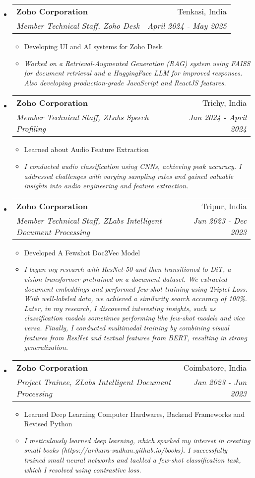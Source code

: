 \documentclass[letterpaper,11pt]{article}
\makeatletter
\newcommand{\resitem}[1]{\item #1 \vspace{-2pt}}
\newcommand{\ressubheading}[4]{
\begin{tabular*}{6.5in}{l@{\extracolsep{\fill}}r}
    \textbf{#1} & #2 \\
    \textit{#3} & \textit{#4} \\
\end{tabular*}\vspace{-4pt}} %
\makeatother
\begin{document}
\begin{itemize}
\begin{itemize}
    \end{itemize}
\newpage
\item[]
    \ressubheading{Zoho Corporation}{Tenkasi, India}{Member Technical Staff, Zoho Desk}{April 2024 - May 2025}
    \begin{itemize}
        \resitem{Developing UI and AI systems for Zoho Desk.}
        \resitem{\textit{Worked on a Retrieval-Augmented Generation (RAG) system using FAISS for document retrieval and a HuggingFace LLM for improved responses. Also developing production-grade JavaScript and ReactJS features.}}
    \end{itemize}
\item[]
	\ressubheading{Zoho Corporation}{Trichy, India}{Member Technical Staff, ZLabs Speech Profiling}{Jan 2024 - April 2024}
	\begin{itemize}
		\resitem{Learned about Audio Feature Extraction}
		\resitem{\textit{I conducted audio classification using CNNs, achieving peak accuracy. I addressed challenges with varying sampling rates and gained valuable insights into audio engineering and feature extraction.}}
	\end{itemize}
	
\item[]
	\ressubheading{Zoho Corporation}{Tripur, India}{Member Technical Staff, ZLabs Intelligent Document Processing}{Jun 2023 - Dec 2023}
	\begin{itemize}
		\resitem{Developed A Fewshot Doc2Vec Model}
		\resitem{\textit{I began my research with ResNet-50 and then transitioned to DiT, a vision transformer pretrained on a document dataset. We extracted document embeddings and performed few-shot training using Triplet Loss. With well-labeled data, we achieved a similarity search accuracy of 100\%. Later, in my research, I discovered interesting insights, such as classification models sometimes performing like few-shot models and vice versa. Finally, I conducted multimodal training by combining visual features from ResNet and textual features from BERT, resulting in strong generalization.}}
	\end{itemize}

\item[]
	\ressubheading{Zoho Corporation}{Coimbatore, India}{Project Trainee, ZLabs Intelligent Document Processing}{Jan 2023 - Jun 2023}
	\begin{itemize}
		\resitem{Learned Deep Learning Computer Hardwares, Backend Frameworks and Revised Python}
		\resitem{\textit{I meticulously learned deep learning, which sparked my interest in creating small books (https://arihara-sudhan.github.io/books). I successfully trained small neural networks and tackled a few-shot classification task, which I resolved using contrastive loss.}}
	\end{itemize}

\end{itemize}
\end{document}
